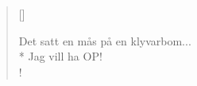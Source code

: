 
\settowidth{\versewidth}{Det satt en mås på en klyvarbom...}



\begin{verse}[\versewidth]

Det satt en mås på en klyvarbom...\\*
Jag vill ha OP!\\!


\end{verse}

